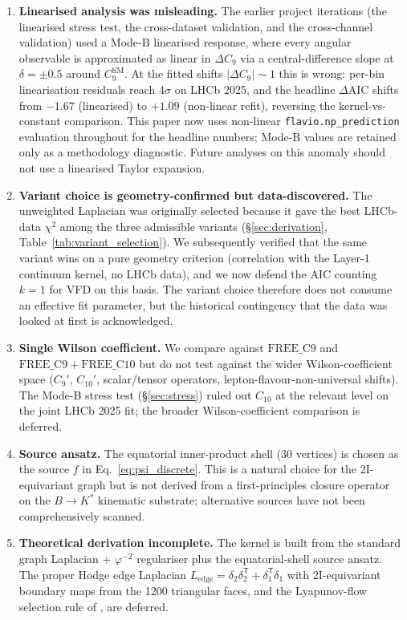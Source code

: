 \begin{enumerate}
\item \textbf{Linearised analysis was misleading.} The earlier
  project iterations (the linearised stress test, the cross-dataset
  validation, and the cross-channel validation) used a Mode-B
  linearised response, where every angular observable is approximated
  as linear
  in $\Delta C_{9}$ via a central-difference slope at $\delta=\pm 0.5$
  around $C_{9}^{\mathrm{SM}}$. At the fitted shifts
  $|\Delta C_{9}|\sim 1$ this is wrong: per-bin linearisation
  residuals reach $4\sigma$ on LHCb 2025, and the headline
  $\Delta\mathrm{AIC}$ shifts from $-1.67$ (linearised) to $+1.09$
  (non-linear refit), reversing the kernel-vs-constant comparison.
  This paper now uses non-linear \texttt{flavio.np\_prediction}
  evaluation throughout for the headline numbers; Mode-B values are
  retained only as a methodology diagnostic. Future analyses on this
  anomaly should not use a linearised Taylor expansion.

\item \textbf{Variant choice is geometry-confirmed but data-discovered.}
  The unweighted Laplacian was originally selected because it gave
  the best LHCb-data $\chi^{2}$ among the three admissible variants
  (\S\ref{sec:derivation}, Table~\ref{tab:variant_selection}).
  We subsequently verified that the same variant wins on a pure
  geometry criterion (correlation with the Layer-1 continuum kernel,
  no LHCb data), and we now defend the AIC counting $k=1$ for VFD on
  this basis. The variant choice therefore does not consume an
  effective fit parameter, but the historical contingency that the
  data was looked at first is acknowledged.

\item \textbf{Single Wilson coefficient.} We compare against
  $\mathrm{FREE\_C9}$ and $\mathrm{FREE\_C9 + FREE\_C10}$ but do not
  test against the wider Wilson-coefficient space ($C_{9}'$, $C_{10}'$,
  scalar/tensor operators, lepton-flavour-non-universal shifts).
  The Mode-B stress test (\S\ref{sec:stress}) ruled out $C_{10}$ at
  the relevant level on the joint LHCb 2025 fit; the broader
  Wilson-coefficient comparison is deferred.

\item \textbf{Source ansatz.} The equatorial inner-product shell
  (30 vertices) is chosen as the source $f$ in
  Eq.~\eqref{eq:psi_discrete}. This is a natural choice for the
  2I-equivariant graph but is not derived from a first-principles
  closure operator on the $B\to K^{*}$ kinematic substrate; alternative
  sources have not been comprehensively scanned.

\item \textbf{Theoretical derivation incomplete.} The kernel is built
  from the standard graph Laplacian + $\varphi^{-2}$ regulariser plus
  the equatorial-shell source ansatz. The proper Hodge edge Laplacian
  $L_{\mathrm{edge}} = \delta_{2}\delta_{2}^{\mathsf T} +
  \delta_{1}^{\mathsf T}\delta_{1}$ with 2I-equivariant boundary maps
  from the 1200 triangular faces, and the Lyapunov-flow selection
  rule of \citep{SmartAdaptiveClosureTransport2026}, are deferred.
\end{enumerate}


